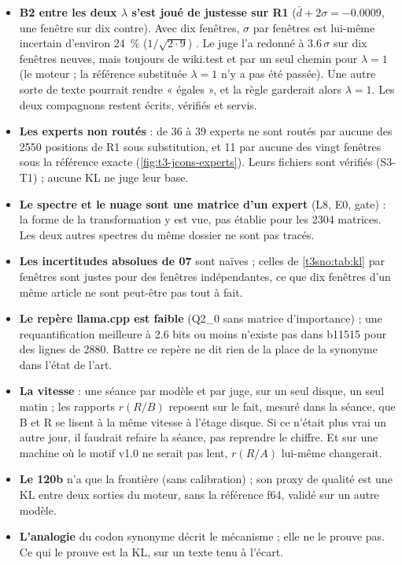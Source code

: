 \begin{faux}
\begin{itemize}
\item \textbf{B2 entre les deux $\lambda$ s'est joué de justesse sur R1} ($\bar d + 2\sigma = -\num{0.0009}$, une fenêtre sur dix contre). Avec dix fenêtres, $\sigma$ par fenêtres est lui-même incertain d'environ \SI{24}{\percent} ($1/\sqrt{2\cdot 9}$) \calc. Le juge l'a redonné à \num{3.6}\,$\sigma$ sur dix fenêtres neuves, mais toujours de wiki.test et par un seul chemin pour $\lambda = 1$ (le moteur ; la référence substituée $\lambda = 1$ n'y a pas été passée). Une autre sorte de texte pourrait rendre « égales », et la règle garderait alors $\lambda = 1$. Les deux compagnons restent écrits, vérifiés et servis.
\item \textbf{Les experts non routés} : de 36 à 39 experts ne sont routés par aucune des \num{2550} positions de R1 sous substitution, et 11 par aucune des vingt fenêtres sous la référence exacte (\cref{fig:t3-jcons-experts}). Leurs fichiers sont vérifiés (S3-T1) ; aucune KL ne juge leur base.
\item \textbf{Le spectre et le nuage sont une matrice d'un expert} (L8, E0, gate) : la forme de la transformation y est vue, pas établie pour les \num{2304} matrices. Les deux autres spectres du même dossier ne sont pas tracés.
\item \textbf{Les incertitudes absolues de 07} sont naïves ; celles de \cref{t3sno:tab:kl} par fenêtres sont justes pour des fenêtres indépendantes, ce que dix fenêtres d'un même article ne sont peut-être pas tout à fait.
\item \textbf{Le repère llama.cpp est faible} (Q2\_0 sans matrice d'importance) ; une requantification meilleure à \num{2.6} bits ou moins n'existe pas dans b11515 pour des lignes de \num{2880}. Battre ce repère ne dit rien de la place de la synonyme dans l'état de l'art.
\item \textbf{La vitesse} : une séance par modèle et par juge, sur un seul disque, un seul matin ; les rapports $r(R/B)$ reposent sur le fait, mesuré dans la séance, que B et R se lisent à la même vitesse à l'étage disque. Si ce n'était plus vrai un autre jour, il faudrait refaire la séance, pas reprendre le chiffre. Et sur une machine où le motif v1.0 ne serait pas lent, $r(R/A)$ lui-même changerait.
\item \textbf{Le 120b} n'a que la frontière (sans calibration) ; son proxy de qualité est une KL entre deux sorties du moteur, sans la référence f64, validé sur un autre modèle.
\item \textbf{L'analogie} du codon synonyme décrit le mécanisme ; elle ne le prouve pas. Ce qui le prouve est la KL, sur un texte tenu à l'écart.
\end{itemize}
\end{faux}
